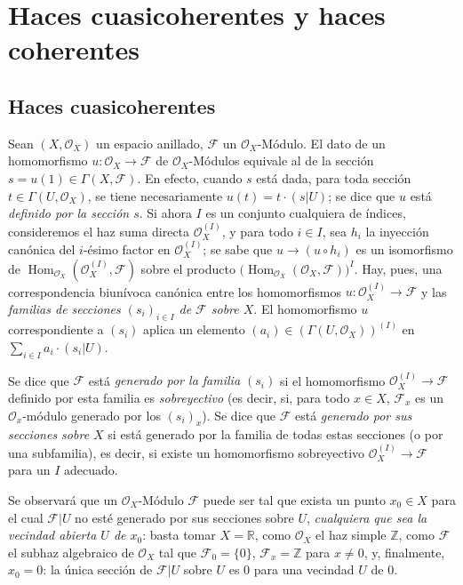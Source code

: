 \section{Haces cuasicoherentes y haces coherentes}
\label{section:0.5-fr}

\subsection{Haces cuasicoherentes}
\label{subsection:0.5.1-fr}

\begin{env}[5.1.1]
\label{0.5.1.1-fr}
Sean $(X,\mathcal{O}_X)$ un espacio anillado, $\mathcal{F}$ un
$\mathcal{O}_X$-Módulo. El dato de un homomorfismo
$u:\mathcal{O}_X\to\mathcal{F}$ de $\mathcal{O}_X$-Módulos equivale al
de la sección $s=u(1)\in\Gamma(X,\mathcal{F})$. En efecto, cuando $s$ está
dada, para toda sección $t\in\Gamma(U,\mathcal{O}_X)$, se tiene necesariamente
$u(t)=t\cdot(s|U)$; se dice que $u$ está \emph{definido por la sección $s$}. Si
ahora $I$ es un conjunto cualquiera de índices, consideremos el haz
suma directa $\mathcal{O}_X^{(I)}$, y para todo $i\in I$, sea $h_i$
la inyección canónica del $i$-ésimo factor en $\mathcal{O}_X^{(I)}$; se sabe
que $u\to(u\circ h_i)$ es un isomorfismo de
$\operatorname{Hom}_{\mathcal{O}_X}(\mathcal{O}_X^{(I)},\mathcal{F})$ sobre el
producto
$\bigl(\operatorname{Hom}_{\mathcal{O}_X}(\mathcal{O}_X,\mathcal{F})\bigr)^I$.
Hay, pues, una correspondencia biunívoca canónica entre los homomorfismos
$u:\mathcal{O}_X^{(I)}\to\mathcal{F}$ y las \emph{familias de secciones
$(s_i)_{i\in I}$ de $\mathcal{F}$ sobre $X$}. El homomorfismo $u$
correspondiente a $(s_i)$ aplica un elemento
$(a_i)\in(\Gamma(U,\mathcal{O}_X))^{(I)}$ en
$\sum_{i\in I}a_i\cdot(s_i|U)$.

Se dice que $\mathcal{F}$ está \emph{generado por la familia $(s_i)$} si
el homomorfismo $\mathcal{O}_X^{(I)}\to\mathcal{F}$ definido
por esta familia es \emph{sobreyectivo} (es decir, si, para todo
$x\in X$, $\mathcal{F}_x$ es un $\mathcal{O}_x$-módulo generado por los
$(s_i)_x$). Se dice que $\mathcal{F}$ está \emph{generado por sus secciones
sobre $X$} si está generado por la familia de todas estas secciones (o
por una subfamilia), es decir, si existe un homomorfismo sobreyectivo
$\mathcal{O}_X^{(I)}\to\mathcal{F}$ para un $I$ adecuado.

Se observará que un $\mathcal{O}_X$-Módulo $\mathcal{F}$ puede ser tal que
exista un punto $x_0\in X$ para el cual $\mathcal{F}|U$ no esté generado por
sus secciones sobre $U$, \emph{cualquiera que sea la vecindad abierta $U$ de
$x_0$}: basta tomar $X=\mathbb{R}$, como $\mathcal{O}_X$ el haz
simple $\mathbb{Z}$, como $\mathcal{F}$ el subhaz algebraico de
$\mathcal{O}_X$ tal que $\mathcal{F}_0=\{0\}$, $\mathcal{F}_x=\mathbb{Z}$ para
$x\ne0$, y, finalmente, $x_0=0$: la única sección de $\mathcal{F}|U$ sobre
$U$ es $0$ para una vecindad $U$ de $0$.
\end{env}

